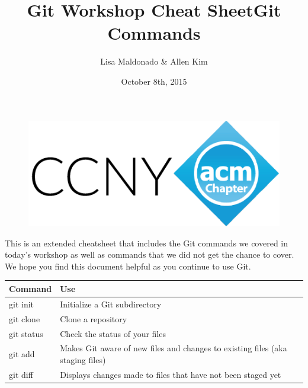 \documentclass{article} %
\begin{document}
\setlength{\textfloatsep}{.01pt}

\begin{figure}[t]
\includegraphics[scale=0.5]{ccnylogo0}
\centering
\end{figure}

\author{Lisa Maldonado \& Allen Kim}
\title{Git Workshop Cheat Sheet}
\date{October 8th, 2015}
\maketitle

\begin{center}
This is an extended cheatsheet that includes the Git commands we covered in today's workshop as well as commands that we did not get the chance to cover. We hope you find this document helpful as you continue to use Git. \newline
\end{center}

\title{\large Git Commands}
\centering

\begin{center}
    \begin{tabular}{ | l | p{6cm} |}
    \hline
    Command & Use \\ \hline
    git \color{blue}init & Initialize a Git subdirectory \\ 
    git \color{blue}clone & Clone a repository \\ 
    git \color{blue}status & Check the status of your files  \\
    
    git \color{blue}add & Makes Git aware of new files and changes to existing files (aka staging files)  \\
    
    git \color{blue}diff & Displays changes made to files that have not been staged yet  \\
    
    \end{tabular}
\end{center}
\end{document}
